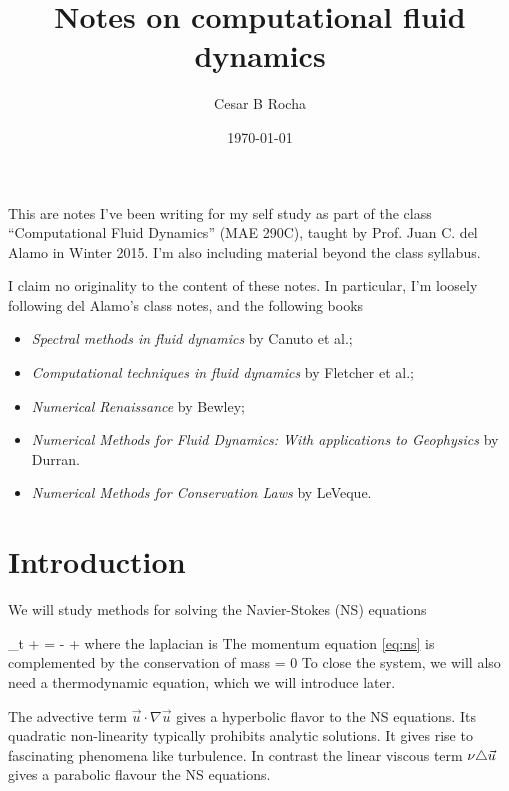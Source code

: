 \documentclass[11pt]{article}
\title{Notes on computational fluid dynamics}
\author{Cesar B Rocha}
\date{\today}
\begin{document}


\maketitle

This are notes I've been writing for my self study as part of the class ``Computational Fluid Dynamics'' (MAE 290C), taught by Prof. Juan C. del Alamo in Winter 2015. I'm also including material beyond the class syllabus.


I claim no originality to the content of these notes.  In particular, I'm loosely following del Alamo's class notes, and the following books

\begin{itemize}

    \item \textit{Spectral methods in fluid dynamics} by Canuto et al.;

    \item \textit{Computational techniques in fluid dynamics} by Fletcher et al.;

    \item \textit{Numerical Renaissance} by Bewley;

    \item \textit{Numerical Methods for Fluid Dynamics: With applications 
        to Geophysics} by Durran.

    \item \textit{Numerical Methods for Conservation Laws} by LeVeque.

\end{itemize}

\section{Introduction}
We will study methods for solving  the Navier-Stokes (NS) equations

\beq
\label{eq:ns}
\p_t  + \cdot \nabla {} = - + \nu \lap {}\com
\eeq
where the laplacian is
\beq
\label{eq:lap_defn}
\lap {} \nabla \cdot \nabla
\eeq
The momentum equation \eqref{eq:ns} is complemented by the conservation of mass
\beq
\label{eq:cons_mass}
\nabla\cdot{} = 0\per
\eeq
To close the system, we will also need a thermodynamic equation, which we will introduce later.

The advective term $\vec{u}\cdot\nabla\vec{u}$ gives a hyperbolic flavor to the NS equations. Its quadratic non-linearity typically prohibits analytic solutions. It gives rise to fascinating phenomena like turbulence. In contrast the linear viscous term $\nu\triangle\vec{u}$ gives a parabolic flavour the NS equations.
\end{document}
